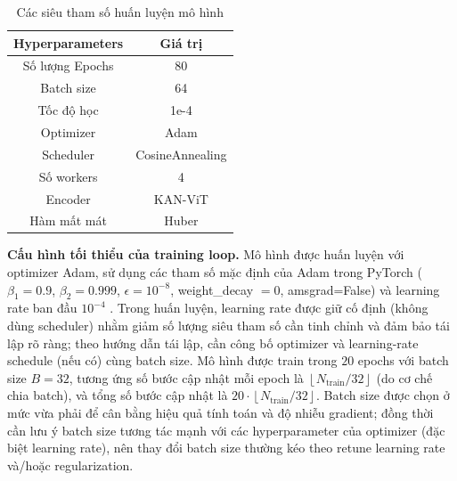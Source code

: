 \documentclass[../DoAn.tex]{subfiles}
\begin{document}
\begin{table}[htbp]
  \centering
  \caption{Các siêu tham số huấn luyện mô hình}
  \begin{tabular}{|c|c|}
    \hline
    \textbf{Hyperparameters} & \textbf{Giá trị}\\\hline
    Số lượng Epochs & 80    \\\hline
    Batch size & 64   \\\hline
    Tốc độ học & 1e-4 \\\hline
    Optimizer & Adam  \\\hline
    Scheduler & CosineAnnealing \\\hline
    Số workers & 4 \\\hline
    Encoder & KAN-ViT \\\hline
    Hàm mất mát & Huber  \\\hline

  \end{tabular}
  \label{tab:hyper}
\end{table}

\textbf{Cấu hình tối thiểu của training loop.}
Mô hình được huấn luyện với optimizer Adam, sử dụng các tham số mặc định của Adam trong PyTorch
($\beta_1=0.9$, $\beta_2=0.999$, $\epsilon=10^{-8}$, weight\_decay $=0$, amsgrad=False) và learning rate ban đầu
$10^{-4}$ .
Trong huấn luyện, learning rate được giữ cố định (không dùng scheduler) nhằm giảm số lượng siêu tham số cần tinh chỉnh
và đảm bảo tái lập rõ ràng; theo hướng dẫn tái lập, cần công bố optimizer và learning-rate schedule (nếu có) cùng batch size.
Mô hình được train trong $20$ epochs với batch size $B=32$, tương ứng số bước cập nhật mỗi epoch là
$\left\lfloor N_{\text{train}}/32 \right\rfloor$ (do cơ chế chia batch), và tổng số bước cập nhật là
$20\cdot\left\lfloor N_{\text{train}}/32 \right\rfloor$.
Batch size được chọn ở mức vừa phải để cân bằng hiệu quả tính toán và độ nhiễu gradient; đồng thời cần lưu ý batch size
tương tác mạnh với các hyperparameter của optimizer (đặc biệt learning rate), nên thay đổi batch size thường kéo theo
retune learning rate và/hoặc regularization.
\end{document}
